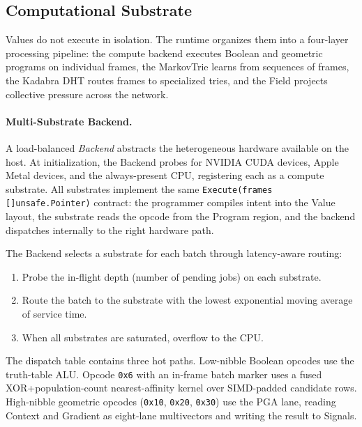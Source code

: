 \subsection{Computational Substrate}
\label{sec:substrate}

Values do not execute in isolation.  The runtime organizes them into a
four-layer processing pipeline: the compute backend executes Boolean and
geometric programs on individual frames, the MarkovTrie learns from sequences of
frames, the Kadabra DHT routes frames to specialized tries, and the
Field projects collective pressure across the network.

\paragraph{Multi-Substrate Backend.}
\label{sec:multi_backend}
A load-balanced \emph{Backend} abstracts the heterogeneous hardware
available on the host.  At initialization, the Backend probes for
NVIDIA CUDA devices, Apple Metal devices, and the always-present CPU,
registering each as a compute substrate.  All substrates implement the
same \texttt{Execute(frames []unsafe.Pointer)} contract: the programmer
compiles intent into the Value layout, the substrate reads the opcode
from the Program region, and the backend dispatches internally to the
right hardware path.

The Backend selects a substrate for each batch through latency-aware
routing:
\begin{enumerate}[nosep]
  \item Probe the in-flight depth (number of pending jobs) on each
        substrate.
  \item Route the batch to the substrate with the lowest exponential
        moving average of service time.
  \item When all substrates are saturated, overflow to the CPU.
\end{enumerate}

The dispatch table contains three hot paths.  Low-nibble Boolean opcodes
use the truth-table ALU.  Opcode \texttt{0x6} with an in-frame batch
marker uses a fused XOR+population-count nearest-affinity kernel over
SIMD-padded candidate rows.  High-nibble geometric opcodes
(\texttt{0x10}, \texttt{0x20}, \texttt{0x30}) use the PGA lane, reading
Context and Gradient as eight-lane multivectors and writing the result
to Signals.

